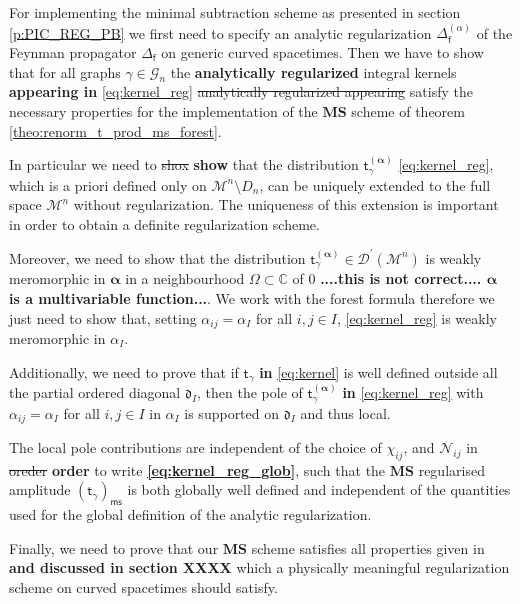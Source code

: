 \documentclass[11pt]{book}
\newcommand{\com}[1]{{\color{red}\bf #1}}
\newcommand{\sbar}[1]{\sout{\color{red} #1}}
\newcommand{\ms}{\mathsf{ms}}
\newcommand{\MS}{\textbf{MS}}
\newcommand{\alphabd}{\boldsymbol{\alpha}}
\newcommand{\Dcal}{\mathcal{D}}
\newcommand{\Gcal}{\mathcal{G}}
\newcommand{\Mcal}{\mathcal{M}}
\newcommand{\Ncal}{\mathcal{N}}
\newcommand{\Cbb}{\mathbb{C}}
\newcommand{\drak}{\mathfrak{d}}
\newcommand{\fsf}{\mathsf{f}}
\newcommand{\tsf}{\mathsf{t}}
\theoremstyle{break}
\begin{document}
For implementing the minimal subtraction scheme as presented in section \ref{p:PIC_REG_PB} we first need to specify an analytic regularization $\Delta^{(\alpha)}_\fsf$ of the Feynman propagator $\Delta_\fsf$ on generic curved spacetimes. Then we have to show that for all graphs $\gamma \in \Gcal_n$ the \com{analytically regularized} integral kernels \com{appearing in} \eqref{eq:kernel_reg} \sbar{analytically regularized appearing} satisfy the necessary properties for the implementation of the $\MS$ scheme of theorem \ref{theo:renorm_t_prod_ms_forest}. 


In particular we need to \sbar{shox} \com{show} that the distribution $\tsf^{(\alphabd)}_\gamma$ \eqref{eq:kernel_reg}, which is a priori defined only on $\Mcal^n \setminus D_n$, can be uniquely extended to the full space $\Mcal^n$ without regularization. The uniqueness of this extension is important in order to obtain a definite regularization scheme. 


Moreover, we need to show that the distribution $\tsf^{(\alphabd)}_\gamma \in \Dcal^\prime(\Mcal^n)$ is weakly meromorphic in $\alphabd$ in a neighbourhood $\Omega \subset \Cbb$ of 0 \com{....this is not correct.... $\alphabd$ is a multivariable function...}. We work with the forest formula therefore we just need to show that, setting $\alpha_{ij} = \alpha_I$ for all $i,j\in I$, \eqref{eq:kernel_reg} is weakly meromorphic in $\alpha_I$. 


Additionally, we need to prove that if $\tsf_\gamma$ \com{in} \eqref{eq:kernel} is well defined outside all the partial ordered diagonal $\drak_I$, then the pole of $\tsf^{(\alphabd)}_\gamma$ \com{in} \eqref{eq:kernel_reg} with $\alpha_{ij} = \alpha_I$ for all $i,j\in I$ in $\alpha_I$ is supported on $\drak_I$ and thus local. 


The local pole contributions are independent of the choice of $\chi_{ij}$, and $\Ncal_{ij}$ in \sbar{oreder} \com{order} to write \com{\eqref{eq:kernel_reg_glob}}, such that the $\MS$ regularised amplitude $(\tsf_\gamma)_\ms$ is both globally well defined and independent of the quantities used for the global definition of the analytic regularization. 


Finally, we need to prove that our $\MS$ scheme satisfies all properties given in \cite{hollands_local_2001,hollands_existence_2002} \com{and discussed in section XXXX} which a physically meaningful regularization scheme on curved spacetimes should satisfy.

\bigskip
\end{document}
